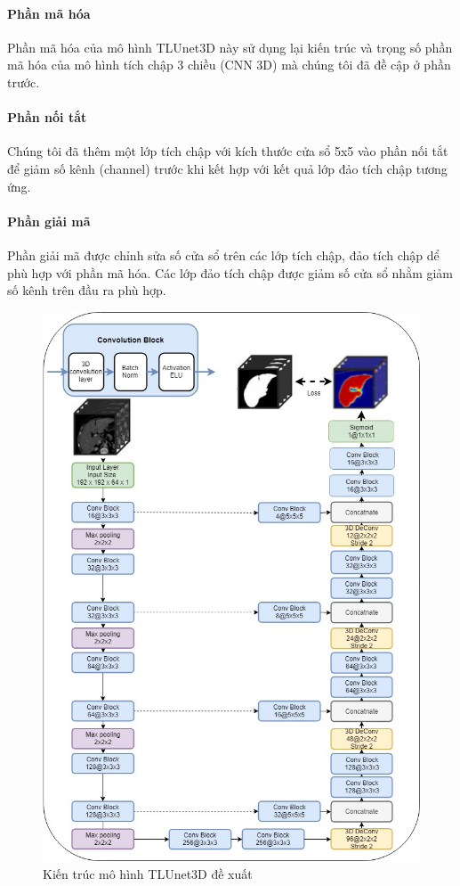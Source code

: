 \paragraph{Phần mã hóa} Phần mã hóa của mô hình TLUnet3D này sử dụng lại kiến trúc và trọng số phần mã hóa của mô hình tích chập 3 chiều (CNN 3D) mà chúng tôi đã đề cập ở phần trước.
\paragraph{Phần nối tắt} Chúng tôi đã thêm một lớp tích chập với kích thước cửa sổ 5x5 vào phần nối tắt để giảm số kênh (channel) trước khi kết hợp với kết quả lớp đảo tích chập tương ứng.
\paragraph{Phần giải mã} Phần giải mã được chỉnh sửa số cửa sổ trên các lớp tích chập, đảo tích chập dể phù hợp với phần mã hóa. Các lớp đảo tích chập được giảm số cửa sổ nhằm giảm số kênh trên đầu ra phù hợp.
\begin{figure}[h]
\centering
    \includegraphics[totalheight=23cm]{Images/UNET3D_pro.jpg}
    \caption{Kiến trúc mô hình TLUnet3D đề xuất}
    \label{Unet3D_pro}
\end{figure}
